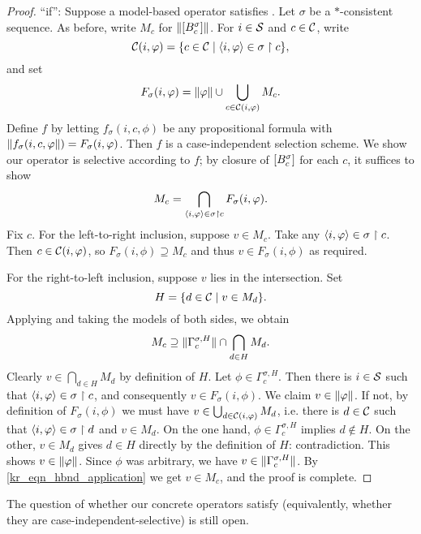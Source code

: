 \begin{proof}
    ``if'': Suppose a model-based operator satisfies \hboundedness{}. Let
    $\sigma$ be a $\ast$-consistent sequence. As before, write $M_c$ for
    $\|{\left[{B^\sigma_c}\right]}\|$. For $i \in \mathcal{S}$ and $c \in \mathcal{C}$,
    write
    \[
        \mathcal{C}(i, \varphi) = \{c \in \mathcal{C} \mid \langle {i, \varphi} \rangle \in \sigma \upharpoonright c\},
    \]
    and set
    \[
        F_\sigma(i, \varphi)
        = \|{\varphi}\| \cup \bigcup_{c \in \mathcal{C}(i, \varphi)}{M_c}.
    \]
    Define $f$ by letting $f_\sigma(i, c, \phi)$ be any propositional formula
    with $\|{f_\sigma(i, c, \varphi}\|) = F_\sigma(i, \varphi)$. Then $f$ is a
    case-independent selection scheme. We show our operator is selective
    according to $f$; by closure of $\left[{B^\sigma_c}\right]$ for each $c$, it
    suffices to show
    \[
        M_c = \bigcap_{\langle {i, \varphi} \rangle \in \sigma \upharpoonright c}{F_\sigma(i, \varphi)}.
    \]
    Fix $c$. For the left-to-right inclusion, suppose $v \in M_c$. Take any
    $\langle {i, \varphi} \rangle \in \sigma \upharpoonright c$. Then $c \in \mathcal{C}(i, \varphi)$, so
    $F_\sigma(i, \phi) \supseteq M_c$ and thus $v \in F_\sigma(i, \phi)$ as
    required.

    For the right-to-left inclusion, suppose $v$ lies in the intersection. Set
    \[
        H = \{d \in \mathcal{C} \mid v \in M_d\}.
    \]
    Applying \hboundedness{} and taking the models of both sides, we obtain
    \begin{equation}
        \label{kr_eqn_hbnd_application}
        M_c
        \supseteq
        \|{\Gamma^{\sigma, H}_c}\| \cap \bigcap_{d \in H}{M_d}.
    \end{equation}
    Clearly $v \in \bigcap_{d \in H}{M_d}$ by definition of $H$. Let $\phi \in
    \Gamma^{\sigma, H}_c$. Then there is $i \in \mathcal{S}$ such that
    $\langle {i, \varphi} \rangle \in \sigma \upharpoonright c$, and consequently $v \in F_\sigma(i,
    \phi)$. We claim $v \in \|{\varphi}\|$. If not, by definition of
    $F_\sigma(i, \phi)$ we must have $v \in \bigcup_{d \in \mathcal{C}(i, \varphi)}{M_d}$,
    i.e. there is $d \in \mathcal{C}$ such that $\langle {i, \varphi} \rangle \in \sigma \upharpoonright d$ and
    $v \in M_d$. On the one hand, $\phi \in \Gamma^{\sigma, H}_c$ implies $d
    \notin H$. On the other, $v \in M_d$ gives $d \in H$ directly by the
    definition of $H$: contradiction. This shows $v \in \|{\varphi}\|$. Since
    $\phi$ was arbitrary, we have $v \in \|{\Gamma^{\sigma, H}_c}\|$. By
    \cref{kr_eqn_hbnd_application} we get $v \in M_c$, and the proof is
    complete.
\end{proof}

The question of whether our concrete operators satisfy \hboundedness{}
(equivalently, whether they are case-independent-selective) is still open.

